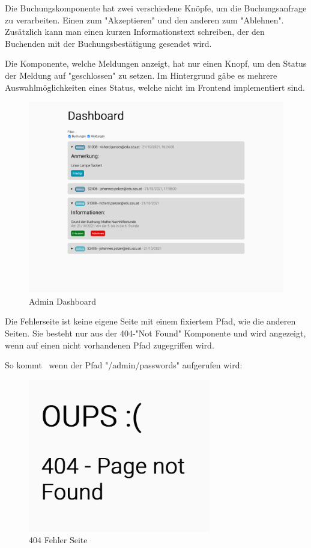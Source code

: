Die Buchungskomponente hat zwei verschiedene Knöpfe, um die Buchungsanfrage zu verarbeiten. Einen zum "Akzeptieren" und den anderen zum "Ablehnen". Zusätzlich kann man einen kurzen Informationstext schreiben, der den Buchenden mit der Buchungsbestätigung gesendet wird. 

Die Komponente, welche Meldungen anzeigt, hat nur einen Knopf, um den Status der Meldung auf "geschlossen" zu setzen. Im Hintergrund gäbe es mehrere Auswahlmöglichkeiten eines Status, welche nicht im Frontend implementiert sind.

\begin{figure}[H]
    \centering
    \includegraphics[width=120mm]{media/WebComponents/AdminSeite_light.png}
    \caption{Admin Dashboard}
    \label{fig:admindashboard}
\end{figure}

\begin{minipage}{\textwidth}
    Die Fehlerseite ist keine eigene Seite mit einem fixiertem Pfad, wie die anderen Seiten. Sie besteht nur aus der 404-"Not Found" Komponente und wird angezeigt, wenn auf einen nicht vorhandenen Pfad zugegriffen wird. 
\end{minipage}

So kommt \zb\ wenn der Pfad "{\ttfamily /admin/passwords}" aufgerufen wird:
    
\begin{figure}[H]
    \centering
    \includegraphics[width=80mm]{media/WebComponents/404.png}
    \caption{404 Fehler Seite}
\end{figure}